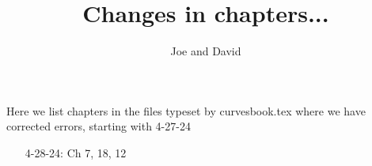 \documentclass[11pt]{amsart}
\title{Changes in chapters...}
\author{Joe and David}
\begin{document}
\maketitle



  Here we list chapters in the files typeset by curvesbook.tex where we have corrected errors, starting with 4-27-24
 
\begin{enumerate}
 \item[4-28-24:] Ch 7, 18, 12

\end{enumerate}
\end{document}

